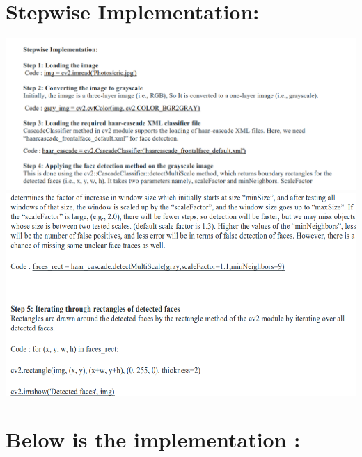 \section{Stepwise Implementation:
}
\includegraphics[width=1.3\textwidth]{step.png}
\includegraphics[width=1.3\textwidth]{step2.png}



\section {Below is the implementation :}

